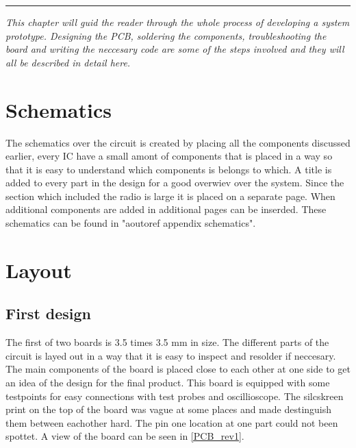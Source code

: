 \vspace{-10ex}%
\rule{\textwidth}{0.3pt}
\vspace{10ex}

\emph{
This chapter will guid the reader through the whole process of developing a system prototype. Designing the PCB, soldering the components, troubleshooting the board and writing the neccesary code are some of the steps involved and they will all be described in detail here.
}

\section{Schematics}
The schematics over the circuit is created by placing all the components discussed earlier, every IC have a small amont of components that is placed in a way so that it is easy to understand which components is belongs to which. A title is added to every part in the design for a good overwiev over the system. Since the section which included the radio is large it is placed on a separate page. When additional components are added in additional pages can be inserded. These schematics can be found in "aoutoref appendix schematics".

\section{Layout} 
\subsection{First design} The first of two boards is 3.5 times 3.5 mm in size. The different parts of the circuit is layed out in a way that it is easy to inspect and resolder if neccesary. The main components of the board is placed close to each other at one side to get an idea of the design for the final product. This board is equipped with some testpoints for easy connections with test probes and oscillioscope. The silcskreen print on the top of the board was vague at some places and made destinguish them between eachother hard. The pin one location at one part could not been spottet.  A view of the board can be seen in \autoref{PCB_rev1}. 

